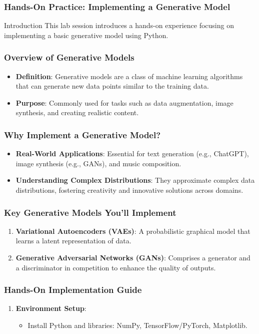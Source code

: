 \documentclass[aspectratio=169]{beamer}
\begin{document}
\begin{frame}
    \frametitle{Hands-On Practice: Implementing a Generative Model}
    \begin{block}{Introduction}
        This lab session introduces a hands-on experience focusing on implementing a basic generative model using Python.
    \end{block}
\end{frame}

\begin{frame}
    \frametitle{Overview of Generative Models}
    \begin{itemize}
        \item \textbf{Definition}: Generative models are a class of machine learning algorithms that can generate new data points similar to the training data.
        \item \textbf{Purpose}: Commonly used for tasks such as data augmentation, image synthesis, and creating realistic content.
    \end{itemize}
\end{frame}

\begin{frame}
    \frametitle{Why Implement a Generative Model?}
    \begin{itemize}
        \item \textbf{Real-World Applications}: Essential for text generation (e.g., ChatGPT), image synthesis (e.g., GANs), and music composition.
        \item \textbf{Understanding Complex Distributions}: They approximate complex data distributions, fostering creativity and innovative solutions across domains.
    \end{itemize}
\end{frame}

\begin{frame}
    \frametitle{Key Generative Models You’ll Implement}
    \begin{enumerate}
        \item \textbf{Variational Autoencoders (VAEs)}: A probabilistic graphical model that learns a latent representation of data.
        \item \textbf{Generative Adversarial Networks (GANs)}: Comprises a generator and a discriminator in competition to enhance the quality of outputs.
    \end{enumerate}
\end{frame}

\begin{frame}
    \frametitle{Hands-On Implementation Guide}
    \begin{enumerate}
        \item \textbf{Environment Setup}:
            \begin{itemize}
                \item Install Python and libraries: NumPy, TensorFlow/PyTorch, Matplotlib.
            \end{itemize}
    \end{enumerate}
\end{frame}
\end{document}
